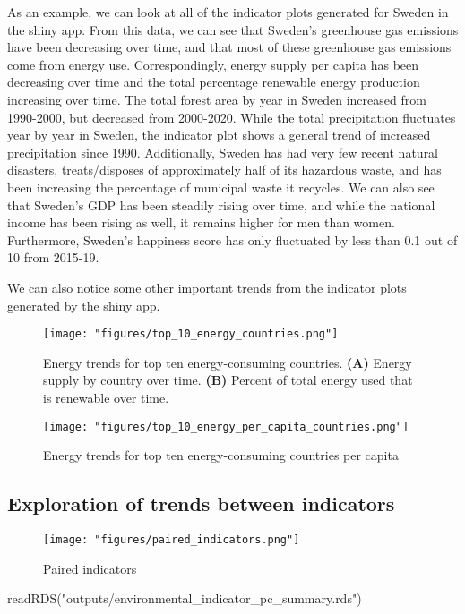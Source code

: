 \documentclass[
]{article}
\newenvironment{Shaded}{\begin{snugshade}}{\end{snugshade}}
\newcommand{\FunctionTok}[1]{\textcolor[rgb]{0.00,0.00,0.00}{#1}}
\newcommand{\NormalTok}[1]{#1}
\newcommand{\StringTok}[1]{\textcolor[rgb]{0.31,0.60,0.02}{#1}}
\begin{document}
As an example, we can look at all of the indicator plots generated for
Sweden in the shiny app. From this data, we can see that Sweden's
greenhouse gas emissions have been decreasing over time, and that most
of these greenhouse gas emissions come from energy use. Correspondingly,
energy supply per capita has been decreasing over time and the total
percentage renewable energy production increasing over time. The total
forest area by year in Sweden increased from 1990-2000, but decreased
from 2000-2020. While the total precipitation fluctuates year by year in
Sweden, the indicator plot shows a general trend of increased
precipitation since 1990. Additionally, Sweden has had very few recent
natural disasters, treats/disposes of approximately half of its
hazardous waste, and has been increasing the percentage of municipal
waste it recycles. We can also see that Sweden's GDP has been steadily
rising over time, and while the national income has been rising as well,
it remains higher for men than women. Furthermore, Sweden's happiness
score has only fluctuated by less than 0.1 out of 10 from 2015-19.

We can also notice some other important trends from the indicator plots
generated by the shiny app.

\begin{figure}
\centering
\texttt{[image: "figures/top\_10\_energy\_countries.png"]}
\caption{Energy trends for top ten energy-consuming countries.
\textbf{(A)} Energy supply by country over time. \textbf{(B)} Percent of
total energy used that is renewable over time.}
\end{figure}

\begin{figure}
\centering
\texttt{[image: "figures/top\_10\_energy\_per\_capita\_countries.png"]}
\caption{Energy trends for top ten energy-consuming countries per
capita}
\end{figure}

\hypertarget{exploration-of-trends-between-indicators}{%
\subsection{Exploration of trends between
indicators}\label{exploration-of-trends-between-indicators}}

\begin{figure}
\centering
\texttt{[image: "figures/paired\_indicators.png"]}
\caption{Paired indicators}
\end{figure}

\begin{Shaded}
\begin{Highlighting}[]
\FunctionTok{readRDS}\NormalTok{(}\StringTok{"outputs/environmental\_indicator\_pc\_summary.rds"}\NormalTok{)}
\end{Highlighting}
\end{Shaded}
\end{document}

